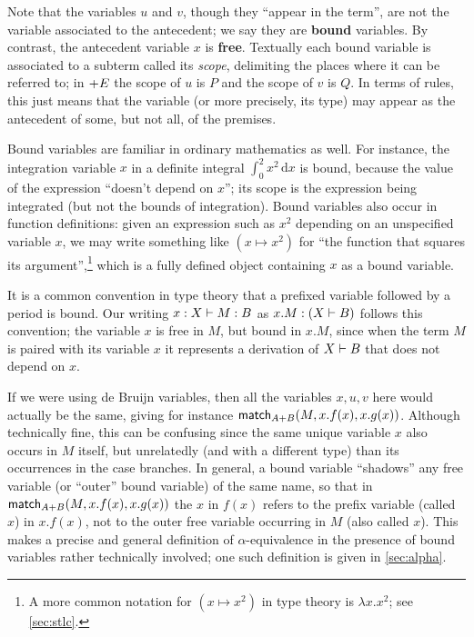 Note that the variables $u$ and $v$, though they ``appear in the term'', are not the variable associated to the antecedent;
we say they are \textbf{bound} variables.
By contrast, the antecedent variable $x$ is \textbf{free}.
Textually each bound variable is associated to a subterm called its \textit{scope}, delimiting the places where it can be referred to;
in $\mathord{+}E$ the scope of $u$ is $P$ and the scope of $v$ is $Q$.
In terms of rules, this just means that the variable (or more precisely, its type) may appear as the antecedent of some, but not all, of the premises.

Bound variables are familiar in ordinary mathematics as well.
For instance, the integration variable $x$ in a definite integral $\int_0^2 x^2\,\mathrm{d}x$ is bound, because the value of the expression ``doesn't depend on $x$''; its scope is the expression being integrated (but not the bounds of integration).
Bound variables also occur in function definitions: given an expression such as $x^2$ depending on an unspecified variable $x$, we may write something like $(x\mapsto x^2)$ for ``the function that squares its argument'',\footnote{A more common notation for $(x\mapsto x^2)$ in type theory is $\lambda x.x^2$; see \cref{sec:stlc}.} which is a fully defined object containing $x$ as a bound variable.

It is a common convention in type theory that a prefixed variable followed by a period is bound.
Our writing $x:X\vdash M:B$ as $x.M:(X\vdash B)$ follows this convention; the variable $x$ is free in $M$, but bound in $x.M$, since when the term $M$ is paired with its variable $x$ it represents a derivation of $X\vdash B$ that does not depend on $x$.

If we were using de Bruijn variables, then all the variables $x,u,v$ here would actually be the same, giving for instance $\mathsf{match}_{A+B}(M,x.f(x),x.g(x))$.
Although technically fine, this can be confusing since the same unique variable $x$ also occurs in $M$ itself, but unrelatedly (and with a different type) than its occurrences in the case branches.
In general, a bound variable ``shadows'' any free variable (or ``outer'' bound variable) of the same name, so that in $\mathsf{match}_{A+B}(M,x.f(x),x.g(x))$ the $x$ in $f(x)$ refers to the prefix variable (called $x$) in $x.f(x)$, not to the outer free variable occurring in $M$ (also called $x$).
This makes a precise and general definition of $\alpha$-equivalence in the presence of bound variables rather technically involved; one such definition is given in \cref{sec:alpha}.

